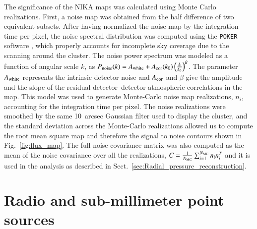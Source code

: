 \documentclass[twocolumn,traditabstract]{aa}
\begin{document}
The significance of the NIKA maps was calculated using Monte Carlo realizations. First, a noise map was obtained from the half difference of two equivalent subsets. After having normalized the noise map by the integration time per pixel, the noise spectral distribution was computed using the {\tt POKER} software \citep{ponthieu2011}, which properly accounts for incomplete sky coverage due to the scanning around the cluster. The noise power spectrum was modeled as a function of angular scale $k$, as $P_{\rm noise}(k) = A_{\rm white} + A_{\rm cor}(k_0) \left(\frac{k}{k_0}\right)^{\beta}$. The parameter $A_{\rm white}$ represents the intrinsic detector noise and $A_{\rm cor}$ and $\beta$ give the amplitude and the slope of the residual detector--detector atmospheric correlations in the map. This model was used to generate Monte-Carlo noise map realizations, $n_i$, accounting for the integration time per pixel. The noise realizations were smoothed by the same 10~arcsec Gaussian filter used to display the cluster, and the standard deviation across the Monte-Carlo realizations allowed us to compute the root mean square map and therefore the signal to noise contours shown in Fig.~\ref{fig:flux_map}. The full noise covariance matrix was also computed as the mean of the noise covariance over all the realizations, $C = \frac{1}{N_{\rm MC}}\sum_{i=1}^{N_{\rm MC}}n_i n_i^{T}$ and it is used in the analysis as described in Sect.~\ref{sec:Radial_pressure_reconstruction}.

\section{Radio and sub-millimeter point sources}\label{Radio_and_infrared_point_sources}
\end{document}
